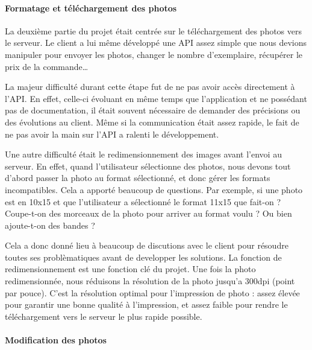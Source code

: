 \bigskip

\paragraph{Formatage et téléchargement des
photos}\label{formatage-et-tuxe9luxe9chargement-des-photos}

\bigskip

La deuxième partie du projet était centrée sur le téléchargement des
photos vers le serveur. Le client a lui même développé une API assez
simple que nous devions manipuler pour envoyer les photos, changer le
nombre d'exemplaire, récupérer le prix de la commande\ldots{}

\bigskip

La majeur difficulté durant cette étape fut de ne pas avoir accès
directement à l'API. En effet, celle-ci évoluant en même temps que
l'application et ne possédant pas de documentation, il était souvent
nécessaire de demander des précisions ou des évolutions au client. Même
si la communication était assez rapide, le fait de ne pas avoir la main
sur l'API a ralenti le développement.

\bigskip

Une autre difficulté était le redimensionnement des images avant l'envoi
au serveur. En effet, quand l'utilisateur sélectionne des photos, nous
devons tout d'abord passer la photo au format sélectionné, et donc gérer
les formats incompatibles. Cela a apporté beaucoup de questions. Par
exemple, si une photo est en 10x15 et que l'utilisateur a sélectionné le
format 11x15 que fait-on ? Coupe-t-on des morceaux de la photo pour
arriver au format voulu ? Ou bien ajoute-t-on des bandes ?

\bigskip

Cela a donc donné lieu à beaucoup de discutions avec le client pour
résoudre toutes ses problèmatiques avant de developper les solutions. La
fonction de redimensionnement est une fonction clé du projet. Une fois
la photo redimensionnée, nous réduisons la résolution de la photo
jusqu'a 300dpi (point par pouce). C'est la résolution optimal pour
l'impression de photo : assez élevée pour garantir une bonne qualité à
l'impression, et assez faible pour rendre le téléchargement vers le
serveur le plus rapide possible.

\bigskip

\paragraph{Modification des photos}\label{modification-des-photos}

